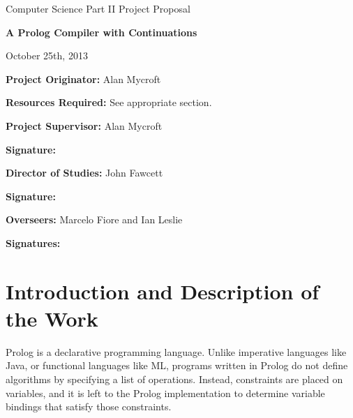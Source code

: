 \documentclass[12pt]{article}
\begin{document}
\newpage

\thispagestyle{empty}

\medskip
{}
\medskip
{}

\vfil

\centerline{\large Computer Science Part II Project Proposal}
\vspace{0.4in}
\centerline{\Large\bf A Prolog Compiler with Continuations}
\vspace{0.3in}
\centerline{\large October 25th, 2013}

\vfil

{\bf Project Originator:} Alan Mycroft

\vspace{0.1in}

{\bf Resources Required:} See appropriate section.

\vspace{0.5in}

{\bf Project Supervisor:} Alan Mycroft

\vspace{0.2in}

{\bf Signature:}

\vspace{0.5in}

{\bf Director of Studies:} John Fawcett

\vspace{0.2in}

{\bf Signature:}

\vspace{0.5in}

{\bf Overseers:} Marcelo Fiore and Ian Leslie

\vspace{0.2in}

{\bf Signatures:} 

\vfil
\eject


\section*{Introduction and Description of the Work}

Prolog is a declarative programming language. Unlike imperative languages like Java, or functional languages like ML, programs written in Prolog do not define algorithms by specifying a list of operations. Instead, constraints are placed on variables, and it is left to the Prolog implementation to determine variable bindings that satisfy those constraints. 
\end{document}
